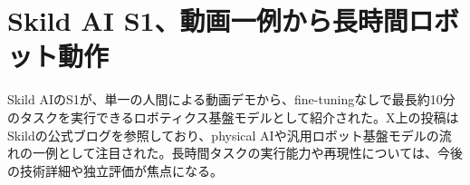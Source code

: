 \section{Skild AI S1、動画一例から長時間ロボット動作}
Skild AIのS1が、単一の人間による動画デモから、fine-tuningなしで最長約10分のタスクを実行できるロボティクス基盤モデルとして紹介された。X上の投稿はSkildの公式ブログを参照しており、physical AIや汎用ロボット基盤モデルの流れの一例として注目された。長時間タスクの実行能力や再現性については、今後の技術詳細や独立評価が焦点になる。
